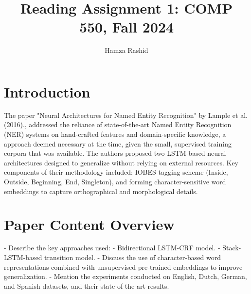 \documentclass[11pt]{article}
\title{Reading Assignment 1: COMP 550, Fall 2024}
\author{Hamza Rashid}
\date{}
\begin{document}
\maketitle
\section*{Introduction}


The paper "Neural Architectures for 
Named Entity Recognition" by Lample et al. (2016)., 
addressed the reliance of state-of-the-art 
Named Entity Recognition (NER) systems on hand-crafted 
features and domain-specific knowledge, a approach
deemed necessary at the time, given the small, 
supervised training corpora that was available. 
The authors proposed two LSTM-based neural 
architectures designed to generalize without 
relying on external resources. Key 
components of their methodology included: 
IOBES tagging scheme (Inside, Outside, Beginning, 
End, Singleton), and forming character-sensitive word 
embeddings to capture orthographical and morphological details.



\section*{Paper Content Overview}


- Describe the key approaches used:
  - Bidirectional LSTM-CRF model.
  - Stack-LSTM-based transition model.
- Discuss the use of character-based word representations combined with unsupervised pre-trained embeddings to improve generalization.
- Mention the experiments conducted on English, Dutch, German, and Spanish datasets, and their state-of-the-art results.
\end{document}

